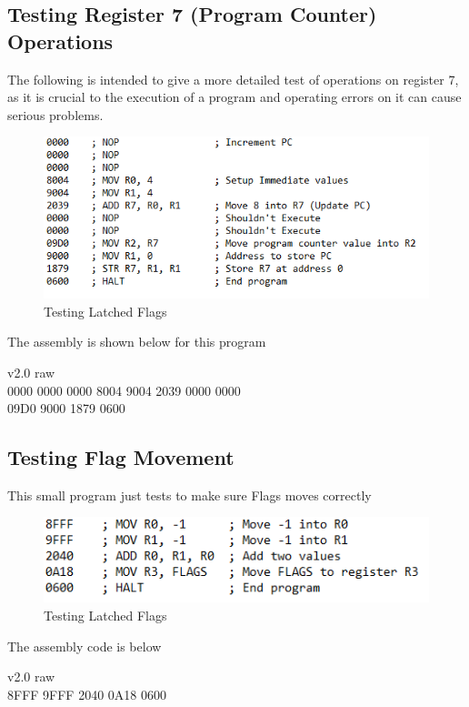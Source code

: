 \documentclass[12pt, letter]{article}
\begin{document}
	\subsection{Testing Register 7 (Program Counter) Operations}
	The following is intended to give a more detailed test of operations on register 7, as it is crucial to the execution of a program and operating errors on it can cause serious problems.
	\begin{figure}[h]
		\centering
		\includegraphics[scale = 1]{pcTest}
		\caption{Testing Latched Flags}
		\label{fig:pcTest}
	\end{figure}

	The assembly is shown below for this program\\
	\begin{tcolorbox}[colback = bg, boxrule = 0pt]
		v2.0 raw\\
		0000 0000 0000 8004 9004 2039 0000 0000\\
		09D0 9000 1879 0600\\
	\end{tcolorbox}
	\bigskip
	
	
	\subsection{Testing Flag Movement}
	This small program just tests to make sure Flags moves correctly\\
	\bigskip
	\newpage
	\begin{figure}[h]
		\centering
		\includegraphics[scale = 1]{NegativeFlags}
		\caption{Testing Latched Flags}
		\label{fig:NegativeFlags}
	\end{figure}
	\bigskip
	The assembly code is below\\
	\begin{tcolorbox}[colback = bg, boxrule = 0pt]
		v2.0 raw\\
		8FFF 9FFF 2040 0A18 0600 \\
	\end{tcolorbox}
	\newpage
\end{document}
